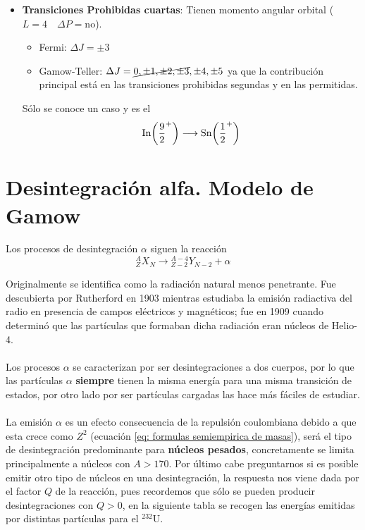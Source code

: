 \begin{itemize}
\begin{itemize}
    \end{itemize}
    \item \textbf{Transiciones Prohibidas cuartas}: Tienen momento angular orbital ($L=4  \quad \Delta P=\mathrm{no}$).
    \begin{itemize}
        \item Fermi: $\Delta J=\pm 3$
        \item Gamow-Teller: $\Delta J=\cancel{0,\pm1, \pm 2,\pm3},\pm4,\pm5 $ ya que la contribución principal está en las transiciones prohibidas segundas y en las permitidas.
    \end{itemize}
     Sólo se conoce un caso y es el $$\mathrm{In}\qty({\frac{9}{2}}^+)\longrightarrow \mathrm{Sn}\qty({\frac{1}{2}}^+)$$
\end{itemize}
\section{Desintegración alfa. Modelo de Gamow}
Los procesos de desintegración $\alpha$ siguen la reacción 
\begin{equation*}
        ^A _Z X_N \longrightarrow {}^{A-4} _{Z-2} Y_{N-2}+\alpha
\end{equation*}

Originalmente se identifica como la radiación natural menos penetrante. Fue descubierta por Rutherford en 1903 mientras estudiaba la emisión radiactiva del radio en presencia de campos eléctricos y magnéticos; fue en 1909 cuando determinó que las partículas que formaban dicha radiación eran núcleos de Helio-4.\\\\ Los procesos $\alpha$ se caracterizan por ser desintegraciones a dos cuerpos, por lo que las partículas $\alpha$ \textbf{siempre} tienen la misma energía para una misma transición de estados, por otro lado por ser partículas cargadas las hace más fáciles de estudiar.\\\\
La emisión $\alpha$ es un efecto consecuencia de la repulsión coulombiana debido a que esta crece como $Z^2$ (ecuación \ref{eq: formulas semiempirica de masas}), será el tipo de desintegración predominante para \textbf{núcleos pesados}, concretamente se limita principalmente a núcleos con $A>170$. Por último cabe preguntarnos si es posible emitir otro tipo de núcleos en una desintegración, la respuesta nos viene dada por el factor $Q$ de la reacción, pues recordemos que sólo se pueden producir desintegraciones con $Q>0$, en la siguiente tabla se recogen las energías emitidas por distintas partículas para el $^{232}\mathrm{U}$.

